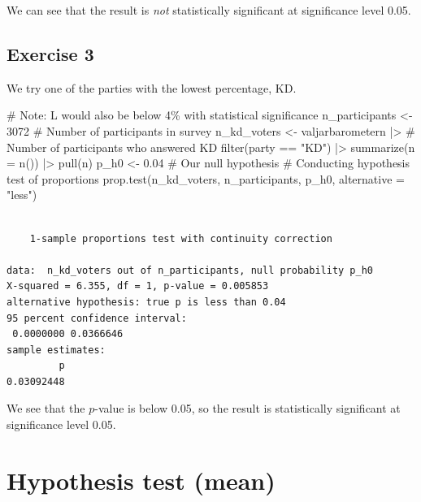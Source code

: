 \documentclass[
  letterpaper,
  DIV=11,
  numbers=noendperiod]{scrreprt}
\newenvironment{Shaded}{\begin{snugshade}}{\end{snugshade}}
\newcommand{\AttributeTok}[1]{\textcolor[rgb]{0.40,0.45,0.13}{#1}}
\newcommand{\CommentTok}[1]{\textcolor[rgb]{0.37,0.37,0.37}{#1}}
\newcommand{\DecValTok}[1]{\textcolor[rgb]{0.68,0.00,0.00}{#1}}
\newcommand{\FloatTok}[1]{\textcolor[rgb]{0.68,0.00,0.00}{#1}}
\newcommand{\FunctionTok}[1]{\textcolor[rgb]{0.28,0.35,0.67}{#1}}
\newcommand{\NormalTok}[1]{\textcolor[rgb]{0.00,0.23,0.31}{#1}}
\newcommand{\OtherTok}[1]{\textcolor[rgb]{0.00,0.23,0.31}{#1}}
\newcommand{\SpecialCharTok}[1]{\textcolor[rgb]{0.37,0.37,0.37}{#1}}
\newcommand{\StringTok}[1]{\textcolor[rgb]{0.13,0.47,0.30}{#1}}
\begin{document}
We can see that the result is \emph{not} statistically significant at
significance level 0.05.

\subsection{Exercise 3}\label{exercise-3-14}

We try one of the parties with the lowest percentage, KD.

\begin{Shaded}
\begin{Highlighting}[]
\CommentTok{\# Note: L would also be below 4\% with statistical significance}
\NormalTok{n\_participants }\OtherTok{\textless{}{-}} \DecValTok{3072} \CommentTok{\# Number of participants in survey}
\NormalTok{n\_kd\_voters }\OtherTok{\textless{}{-}}\NormalTok{ valjarbarometern }\SpecialCharTok{|\textgreater{}} \CommentTok{\# Number of participants who answered KD}
  \FunctionTok{filter}\NormalTok{(party }\SpecialCharTok{==} \StringTok{"KD"}\NormalTok{) }\SpecialCharTok{|\textgreater{}}
  \FunctionTok{summarize}\NormalTok{(}\AttributeTok{n =} \FunctionTok{n}\NormalTok{()) }\SpecialCharTok{|\textgreater{}}
  \FunctionTok{pull}\NormalTok{(n)}
\NormalTok{p\_h0 }\OtherTok{\textless{}{-}} \FloatTok{0.04} \CommentTok{\# Our null hypothesis}
\CommentTok{\# Conducting hypothesis test of proportions}
\FunctionTok{prop.test}\NormalTok{(n\_kd\_voters, n\_participants, p\_h0, }\AttributeTok{alternative =} \StringTok{"less"}\NormalTok{)}
\end{Highlighting}
\end{Shaded}

\begin{verbatim}

    1-sample proportions test with continuity correction

data:  n_kd_voters out of n_participants, null probability p_h0
X-squared = 6.355, df = 1, p-value = 0.005853
alternative hypothesis: true p is less than 0.04
95 percent confidence interval:
 0.0000000 0.0366646
sample estimates:
         p 
0.03092448 
\end{verbatim}

We see that the \(p\)-value is below 0.05, so the result is
statistically significant at significance level 0.05.

\section{Hypothesis test (mean)}\label{hypothesis-test-mean-1}
\end{document}
